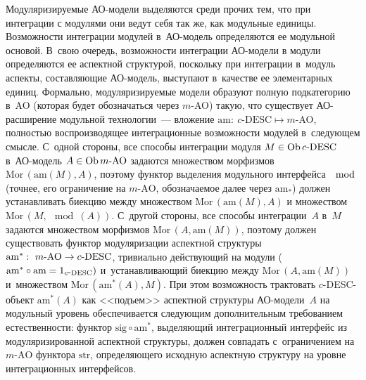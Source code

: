 \begin{multicols}{2}
 Модуляризируемые АО-модели выделяются среди прочих тем, что при
интеграции с модулями они ведут себя так же, как модульные единицы.
Возможности интеграции модулей в~АО-мо\-дель определяются ее модульной
основой. В~свою очередь, возможности интеграции АО-мо\-де\-ли в модули
определяются ее аспектной структурой, поскольку при интеграции в~модуль
аспекты, составляющие АО-мо\-дель, выступают в~качестве ее элементарных
единиц. Формально, модуляризируемые модели образуют полную
подкатегорию в~AO (которая будет обозначаться через $m$-AO) такую, что
существует %
АО-рас\-ши\-ре\-ние модульной технологии~--- вложение $\mathrm{am}:\
 c\mbox{-}\mathrm{DESC} \mapsto m$-AO, пол\-ностью воспроизводящее
интеграционные возможности модулей в~сле\-ду\-ющем смысле. С~одной
стороны, все способы интеграции модуля $M\hm\in \mathrm{Ob}\,
 c\mbox{-}\mathrm{DESC}$ в~АО-мо\-дель $A\hm\in \mathrm{Ob}\, m\mbox{-}\mathrm{AO}$
задаются множеством морфизмов $\mathrm{Mor}\,(\mathrm{am}(M), A)$, поэтому функтор
выделения модульного интерфейса $\mod$ (точнее, его ограничение на
 $m$-$\mathrm{AO}$, обозначаемое далее через $\mathrm{am}_*$) должен устанавливать
биекцию между множеством $\mathrm{Mor}\,(\mathrm{am}(M),A)$ и множеством
$\mathrm{Mor}\,(M, \mod(A))$. С~другой стороны, все способы интеграции~$A$
в~$M$ задаются множеством морфизмов $\mathrm{Mor}\,(A, \mathrm{am}(M))$, поэтому
должен существовать функтор модуляризации аспектной структуры $\mathrm{am}^*:\
m\mbox{-}\mathrm{AO} \hm\to c\mbox{-}\mathrm{DESC}$, тривиально дей\-ст\-ву\-ющий
на модули ($\mathrm{am}^* \circ \mathrm{am} \hm= 1_{c\mbox{-}\mathrm{DESC}})$
и~уста\-нав\-ли\-ва\-ющий биекцию между
$\mathrm{Mor}\,(A, \mathrm{am}(M))$ и~множеством $\mathrm{Mor}\,(\mathrm{am}^*(A), M)$. При
этом возможность трактовать $c$-DESC-объ\-ект $\mathrm{am}^*(A)$ как <<подъем>>
аспектной структуры АО-мо\-де\-ли~$A$ на модульный уровень
обеспечивается следующим дополнительным требованием естественности:
функтор $\mathrm{sig} \circ \mathrm{am}^*$, выделяющий интеграционный интерфейс из
модуляризированной аспектной структуры, должен совпадать с~ограничением
на $m$-$\mathrm{AO}$ функтора $\mathrm{str}$, определяющего исходную аспектную структуру
на уровне интеграционных интерфейсов.


\end{multicols}
